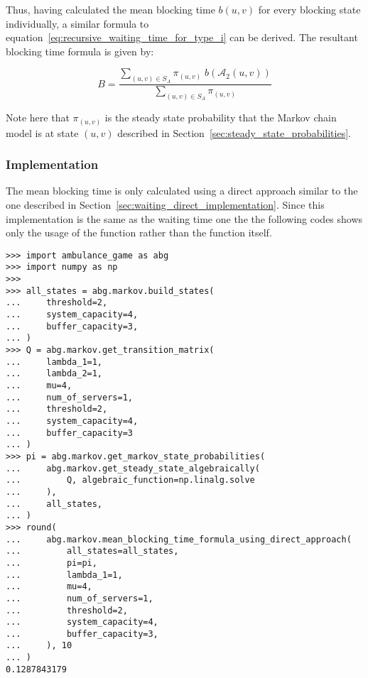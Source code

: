 Thus, having calculated the mean blocking time \(b(u,v)\) for every blocking
state individually, a similar formula to
equation~\eqref{eq:recursive_waiting_time_for_type_i} can be derived.
The resultant blocking time formula is given by:

\begin{equation}\label{eq:blocking_time_formula}
    B = \frac{\sum_{(u,v) \in S_A} \pi_{(u,v)} \; b(\mathcal{A}_2(u,v))}{
        \sum_{(u,v) \in S_A}\pi_{(u,v)}}
\end{equation}

Note here that \(\pi_(u,v)\) is the steady state probability that the Markov
chain model is at state \((u,v)\) described in
Section~\ref{sec:steady_state_probabilities}.

\subsubsection{Implementation}\label{sec:implementation_blocking_time}

The mean blocking time is only calculated using a direct approach
similar to the one described in Section~\ref{sec:waiting_direct_implementation}.
Since this implementation is the same as the waiting time one the the following
codes shows only the usage of the function rather than the function itself.

\begin{lstlisting}[style=pystyle]
>>> import ambulance_game as abg
>>> import numpy as np
>>>
>>> all_states = abg.markov.build_states(
...     threshold=2,
...     system_capacity=4,
...     buffer_capacity=3,
... )
>>> Q = abg.markov.get_transition_matrix(
...     lambda_1=1,
...     lambda_2=1,
...     mu=4,
...     num_of_servers=1,
...     threshold=2,
...     system_capacity=4,
...     buffer_capacity=3
... )
>>> pi = abg.markov.get_markov_state_probabilities(
...     abg.markov.get_steady_state_algebraically(
...         Q, algebraic_function=np.linalg.solve
...     ),
...     all_states,
... )
>>> round(
...     abg.markov.mean_blocking_time_formula_using_direct_approach(
...         all_states=all_states,
...         pi=pi,
...         lambda_1=1,
...         mu=4,
...         num_of_servers=1,
...         threshold=2,
...         system_capacity=4,
...         buffer_capacity=3,
...     ), 10
... )
0.1287843179

\end{lstlisting}
